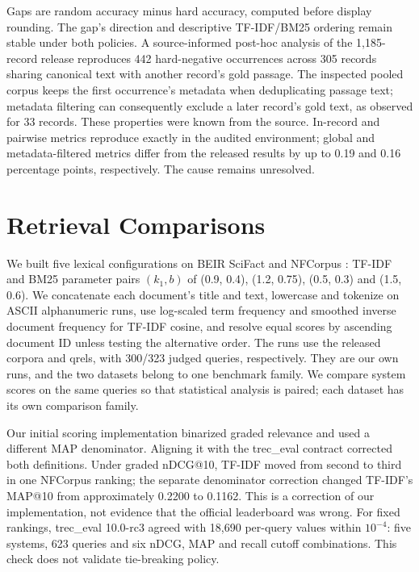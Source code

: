 \documentclass[conference]{IEEEtran}
\begin{document}
Gaps are random accuracy minus hard accuracy, computed before display
rounding. The gap's direction and descriptive TF-IDF/BM25 ordering
remain stable under both policies. A source-informed post-hoc analysis
of the 1,185-record release reproduces 442 hard-negative occurrences
across 305 records sharing canonical text with another record's gold
passage. The inspected pooled corpus keeps the first occurrence's
metadata when deduplicating passage text; metadata filtering can
consequently exclude a later record's gold text, as observed for 33
records. These properties were known from the source. In-record and
pairwise metrics reproduce exactly in the audited environment; global
and metadata-filtered metrics differ from the released results by up to
0.19 and 0.16 percentage points, respectively. The cause remains
unresolved.

\section{Retrieval Comparisons}\label{retrieval-comparisons}

We built five lexical configurations on BEIR SciFact and NFCorpus
\cite{r2}: TF-IDF and BM25 parameter pairs \((k_1, b)\) of (0.9, 0.4),
(1.2, 0.75), (0.5, 0.3) and (1.5, 0.6). We concatenate each document's
title and text, lowercase and tokenize on ASCII alphanumeric runs, use
log-scaled term frequency and smoothed inverse document frequency for
TF-IDF cosine, and resolve equal scores by ascending document ID unless
testing the alternative order. The runs use the released corpora and
qrels, with 300/323 judged queries, respectively. They are our own runs,
and the two datasets belong to one benchmark family. We compare system
scores on the same queries so that statistical analysis is paired; each
dataset has its own comparison family.

Our initial scoring implementation binarized graded relevance and used a
different MAP denominator. Aligning it with the trec\_eval contract
corrected both definitions. Under graded nDCG@10, TF-IDF moved from
second to third in one NFCorpus ranking; the separate denominator
correction changed TF-IDF's MAP@10 from approximately 0.2200 to 0.1162.
This is a correction of our implementation, not evidence that the
official leaderboard was wrong. For fixed rankings, trec\_eval 10.0-rc3
agreed with 18,690 per-query values within \(10^{-4}\): five systems,
623 queries and six nDCG, MAP and recall cutoff combinations. This check
does not validate tie-breaking policy.
\end{document}
